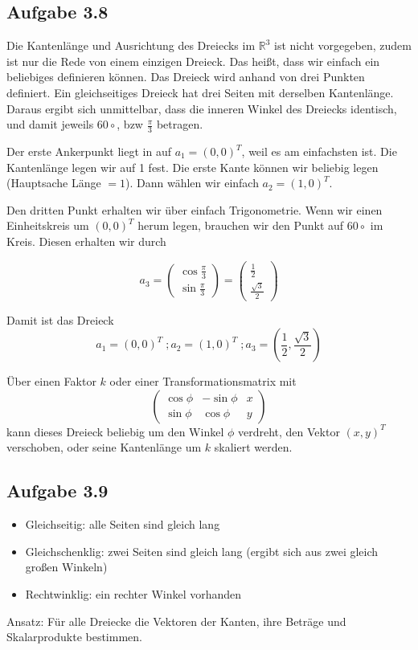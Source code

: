 \documentclass{standalone}
\begin{document}
\subsection{Aufgabe 3.8}
Die Kantenlänge und Ausrichtung des Dreiecks im $\mathbb{R}^3$ ist nicht vorgegeben, zudem ist nur die Rede von einem einzigen Dreieck.
Das heißt, dass wir einfach ein beliebiges definieren können.
Das Dreieck wird anhand von drei Punkten definiert.
Ein gleichseitiges Dreieck hat drei Seiten mit derselben Kantenlänge.
Daraus ergibt sich unmittelbar, dass die inneren Winkel des Dreiecks identisch, und damit jeweils $60\circ$, bzw $\frac{\pi}{3}$ betragen.

Der erste Ankerpunkt liegt in auf $a_1 = (0,0)^T$, weil es am einfachsten ist. Die Kantenlänge legen wir auf 1 fest.
Die erste Kante können wir beliebig legen (Hauptsache Länge $= 1$). Dann wählen wir einfach $a_2 = (1,0)^T$.

Den dritten Punkt erhalten wir über einfach Trigonometrie. Wenn wir einen Einheitskreis um $(0,0)^T$ herum legen, brauchen wir den Punkt auf $60\circ$ im Kreis.
Diesen erhalten wir durch

$$a_3 = \begin{pmatrix}
    \cos \frac{\pi}{3} \\
    \sin \frac{\pi}{3}
\end{pmatrix}
= \begin{pmatrix}
    \frac{1}{2} \\
    \frac{\sqrt{3}}{2}
\end{pmatrix}$$

Damit ist das Dreieck
$$ a_1 = (0,0)^T \; ; a_2 = (1,0)^T \; ; a_3 = (\frac{1}{2}, \frac{\sqrt{3}}{2})$$

Über einen Faktor $k$ oder einer Transformationsmatrix mit $$\begin{pmatrix}
    \cos \phi & -\sin \phi & x\\
    \sin \phi & \cos \phi & y
\end{pmatrix}$$
kann dieses Dreieck beliebig um den Winkel $\phi$ verdreht, den Vektor $(x,y)^T$ verschoben, oder seine Kantenlänge um $k$ skaliert werden.

\subsection{Aufgabe 3.9}
\begin{itemize}
    \item Gleichseitig: alle Seiten sind gleich lang
    \item Gleichschenklig: zwei Seiten sind gleich lang (ergibt sich aus zwei gleich großen Winkeln)
    \item Rechtwinklig: ein rechter Winkel vorhanden
\end{itemize}
Ansatz: Für alle Dreiecke die Vektoren der Kanten, ihre Beträge und Skalarprodukte bestimmen.
\end{document}
